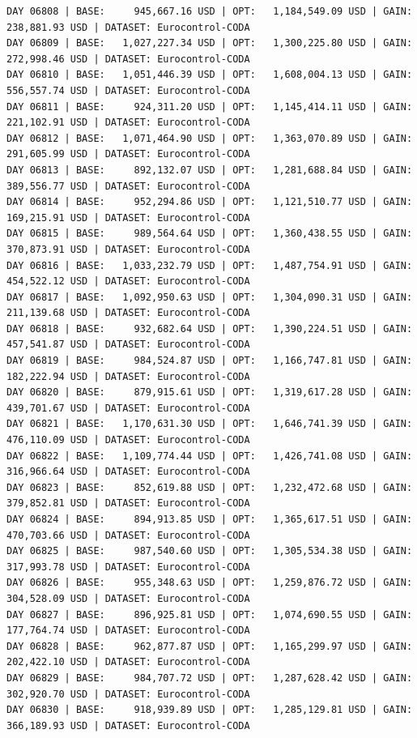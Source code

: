 \documentclass[11pt,a4paper]{article}
\begin{document}
\begin{verbatim}
DAY 06808 | BASE:     945,667.16 USD | OPT:   1,184,549.09 USD | GAIN: 238,881.93 USD | DATASET: Eurocontrol-CODA
DAY 06809 | BASE:   1,027,227.34 USD | OPT:   1,300,225.80 USD | GAIN: 272,998.46 USD | DATASET: Eurocontrol-CODA
DAY 06810 | BASE:   1,051,446.39 USD | OPT:   1,608,004.13 USD | GAIN: 556,557.74 USD | DATASET: Eurocontrol-CODA
DAY 06811 | BASE:     924,311.20 USD | OPT:   1,145,414.11 USD | GAIN: 221,102.91 USD | DATASET: Eurocontrol-CODA
DAY 06812 | BASE:   1,071,464.90 USD | OPT:   1,363,070.89 USD | GAIN: 291,605.99 USD | DATASET: Eurocontrol-CODA
DAY 06813 | BASE:     892,132.07 USD | OPT:   1,281,688.84 USD | GAIN: 389,556.77 USD | DATASET: Eurocontrol-CODA
DAY 06814 | BASE:     952,294.86 USD | OPT:   1,121,510.77 USD | GAIN: 169,215.91 USD | DATASET: Eurocontrol-CODA
DAY 06815 | BASE:     989,564.64 USD | OPT:   1,360,438.55 USD | GAIN: 370,873.91 USD | DATASET: Eurocontrol-CODA
DAY 06816 | BASE:   1,033,232.79 USD | OPT:   1,487,754.91 USD | GAIN: 454,522.12 USD | DATASET: Eurocontrol-CODA
DAY 06817 | BASE:   1,092,950.63 USD | OPT:   1,304,090.31 USD | GAIN: 211,139.68 USD | DATASET: Eurocontrol-CODA
DAY 06818 | BASE:     932,682.64 USD | OPT:   1,390,224.51 USD | GAIN: 457,541.87 USD | DATASET: Eurocontrol-CODA
DAY 06819 | BASE:     984,524.87 USD | OPT:   1,166,747.81 USD | GAIN: 182,222.94 USD | DATASET: Eurocontrol-CODA
DAY 06820 | BASE:     879,915.61 USD | OPT:   1,319,617.28 USD | GAIN: 439,701.67 USD | DATASET: Eurocontrol-CODA
DAY 06821 | BASE:   1,170,631.30 USD | OPT:   1,646,741.39 USD | GAIN: 476,110.09 USD | DATASET: Eurocontrol-CODA
DAY 06822 | BASE:   1,109,774.44 USD | OPT:   1,426,741.08 USD | GAIN: 316,966.64 USD | DATASET: Eurocontrol-CODA
DAY 06823 | BASE:     852,619.88 USD | OPT:   1,232,472.68 USD | GAIN: 379,852.81 USD | DATASET: Eurocontrol-CODA
DAY 06824 | BASE:     894,913.85 USD | OPT:   1,365,617.51 USD | GAIN: 470,703.66 USD | DATASET: Eurocontrol-CODA
DAY 06825 | BASE:     987,540.60 USD | OPT:   1,305,534.38 USD | GAIN: 317,993.78 USD | DATASET: Eurocontrol-CODA
DAY 06826 | BASE:     955,348.63 USD | OPT:   1,259,876.72 USD | GAIN: 304,528.09 USD | DATASET: Eurocontrol-CODA
DAY 06827 | BASE:     896,925.81 USD | OPT:   1,074,690.55 USD | GAIN: 177,764.74 USD | DATASET: Eurocontrol-CODA
DAY 06828 | BASE:     962,877.87 USD | OPT:   1,165,299.97 USD | GAIN: 202,422.10 USD | DATASET: Eurocontrol-CODA
DAY 06829 | BASE:     984,707.72 USD | OPT:   1,287,628.42 USD | GAIN: 302,920.70 USD | DATASET: Eurocontrol-CODA
DAY 06830 | BASE:     918,939.89 USD | OPT:   1,285,129.81 USD | GAIN: 366,189.93 USD | DATASET: Eurocontrol-CODA

\end{verbatim}
\end{document}
